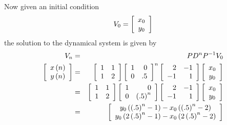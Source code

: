 \begin{solution}
Now given an initial condition
\begin{equation*}
V_0 = \left[
\begin{array}{c}
x_{0} \\
y_{0}
\end{array}
\right]
\end{equation*}
the solution to the dynamical system is given by 
\begin{eqnarray*}
V_n &=& P D^n P^{-1} V_0\\
\left[
\begin{array}{c}
x\left( n\right) \\
y\left( n\right)
\end{array}
\right] &=&\left[
\begin{array}{rr}
1 & 1 \\
1 & 2
\end{array}
\right] \left[
\begin{array}{rr}
1 & 0 \\
0 & .5
\end{array}
\right] ^{n}\left[
\begin{array}{rr}
2 & -1 \\
-1 & 1
\end{array}
\right] \left[
\begin{array}{c}
x_{0} \\
y_{0}
\end{array}
\right] \\
&=&\left[
\begin{array}{rr}
1 & 1 \\
1 & 2
\end{array}
\right] \left[
\begin{array}{rr}
1 & 0 \\
0 & \left( .5\right) ^{n}
\end{array}
\right] \left[
\begin{array}{rr}
2 & -1 \\
-1 & 1
\end{array}
\right] \left[
\begin{array}{c}
x_{0} \\
y_{0}
\end{array}
\right] \\
&=&\left[
\begin{array}{c}
y_{0}\left( \left( .5\right) ^{n}-1\right) -x_{0}\left( \left( .5\right)
^{n}-2\right) \\
y_{0}\left( 2\left( .5\right) ^{n}-1\right) -x_{0}\left( 2\left( .5\right)
^{n}-2\right)
\end{array}
\right] 
\end{eqnarray*}


\end{solution}
